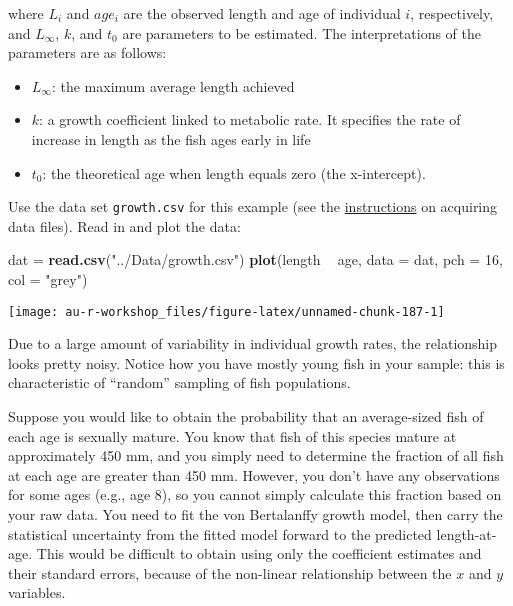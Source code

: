 \documentclass[]{book}
\newenvironment{Shaded}{\begin{snugshade}}{\end{snugshade}}
\newcommand{\KeywordTok}[1]{\textcolor[rgb]{0.13,0.29,0.53}{\textbf{#1}}}
\newcommand{\DataTypeTok}[1]{\textcolor[rgb]{0.13,0.29,0.53}{#1}}
\newcommand{\DecValTok}[1]{\textcolor[rgb]{0.00,0.00,0.81}{#1}}
\newcommand{\StringTok}[1]{\textcolor[rgb]{0.31,0.60,0.02}{#1}}
\newcommand{\OperatorTok}[1]{\textcolor[rgb]{0.81,0.36,0.00}{\textbf{#1}}}
\newcommand{\NormalTok}[1]{#1}
\providecommand{\tightlist}{%
  \setlength{\itemsep}{0pt}\setlength{\parskip}{0pt}}
\theoremstyle{definition}
\theoremstyle{definition}
\theoremstyle{definition}
\theoremstyle{remark}
\begin{document}
where \(L_i\) and \(age_i\) are the observed length and age of
individual \(i\), respectively, and \(L_{\infty}\), \(k\), and \(t_0\)
are parameters to be estimated. The interpretations of the parameters
are as follows:

\begin{itemize}
\tightlist
\item
  \(L_{\infty}\): the maximum average length achieved
\item
  \(k\): a growth coefficient linked to metabolic rate. It specifies the
  rate of increase in length as the fish ages early in life
\item
  \(t_0\): the theoretical age when length equals zero (the
  x-intercept).
\end{itemize}

Use the data set \texttt{growth.csv} for this example (see the
\protect\hyperlink{data-sets}{instructions} on acquiring data files).
Read in and plot the data:

\begin{Shaded}
\begin{Highlighting}[]
\NormalTok{dat =}\StringTok{ }\KeywordTok{read.csv}\NormalTok{(}\StringTok{"../Data/growth.csv"}\NormalTok{)}
\KeywordTok{plot}\NormalTok{(length }\OperatorTok{~}\StringTok{ }\NormalTok{age, }\DataTypeTok{data =}\NormalTok{ dat, }\DataTypeTok{pch =} \DecValTok{16}\NormalTok{, }\DataTypeTok{col =} \StringTok{"grey"}\NormalTok{)}
\end{Highlighting}
\end{Shaded}

\begin{center}\texttt{[image: au-r-workshop\_files/figure-latex/unnamed-chunk-187-1]} \end{center}

Due to a large amount of variability in individual growth rates, the
relationship looks pretty noisy. Notice how you have mostly young fish
in your sample: this is characteristic of ``random'' sampling of fish
populations.

Suppose you would like to obtain the probability that an average-sized
fish of each age is sexually mature. You know that fish of this species
mature at approximately 450 mm, and you simply need to determine the
fraction of all fish at each age are greater than 450 mm. However, you
don't have any observations for some ages (e.g., age 8), so you cannot
simply calculate this fraction based on your raw data. You need to fit
the von Bertalanffy growth model, then carry the statistical uncertainty
from the fitted model forward to the predicted length-at-age. This would
be difficult to obtain using only the coefficient estimates and their
standard errors, because of the non-linear relationship between the
\(x\) and \(y\) variables.
\end{document}
